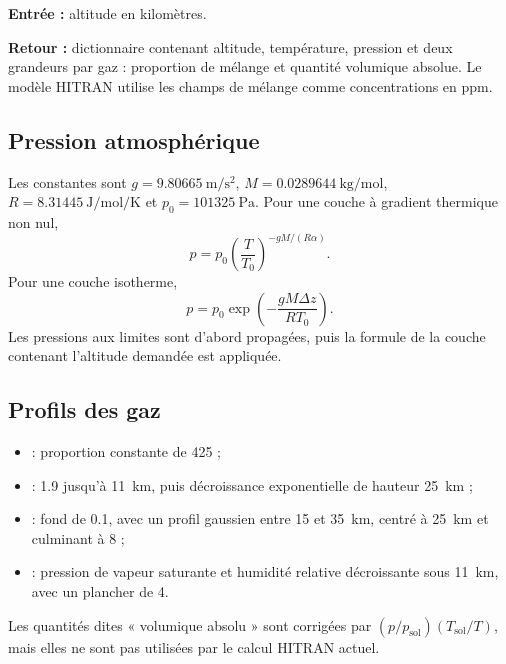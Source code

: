 \documentclass[11pt,a4paper]{article}
\begin{document}
\textbf{Entrée :} altitude en kilomètres.

\textbf{Retour :} dictionnaire contenant altitude, température, pression et
deux grandeurs par gaz : proportion de mélange et quantité volumique absolue.
Le modèle HITRAN utilise les champs de mélange comme concentrations en ppm.

\subsection{Pression atmosphérique}

Les constantes sont $g=\SI{9.80665}{\metre\per\second\squared}$,
$M=\SI{0.0289644}{\kilogram\per\mole}$,
$R=\SI{8.31445}{\joule\per\mole\per\kelvin}$ et
$p_0=\SI{101325}{\pascal}$. Pour une couche à gradient thermique non nul,
\begin{equation}
  p=p_0\left(\frac{T}{T_0}\right)^{-gM/(R\alpha)}.
\end{equation}
Pour une couche isotherme,
\begin{equation}
  p=p_0\exp\left(-\frac{gM\Delta z}{RT_0}\right).
\end{equation}
Les pressions aux limites sont d'abord propagées, puis la formule de la couche
contenant l'altitude demandée est appliquée.

\subsection{Profils des gaz}

\begin{itemize}
  \item {} : proportion constante de \SI{425}{\ppm} ;
  \item {} : \SI{1.9}{\ppm} jusqu'à \SI{11}{\kilo\metre}, puis
        décroissance exponentielle de hauteur \SI{25}{\kilo\metre} ;
  \item {} : fond de \SI{0.1}{\ppm}, avec un profil gaussien entre 15 et
        \SI{35}{\kilo\metre}, centré à \SI{25}{\kilo\metre} et culminant à
        \SI{8}{\ppm} ;
  \item {} : pression de vapeur saturante et humidité relative
        décroissante sous \SI{11}{\kilo\metre}, avec un plancher de
        \SI{4}{\ppm}.
\end{itemize}

Les quantités dites « volumique absolu » sont corrigées par
$(p/p_{\mathrm{sol}})(T_{\mathrm{sol}}/T)$, mais elles ne sont pas utilisées
par le calcul HITRAN actuel.
\end{document}
